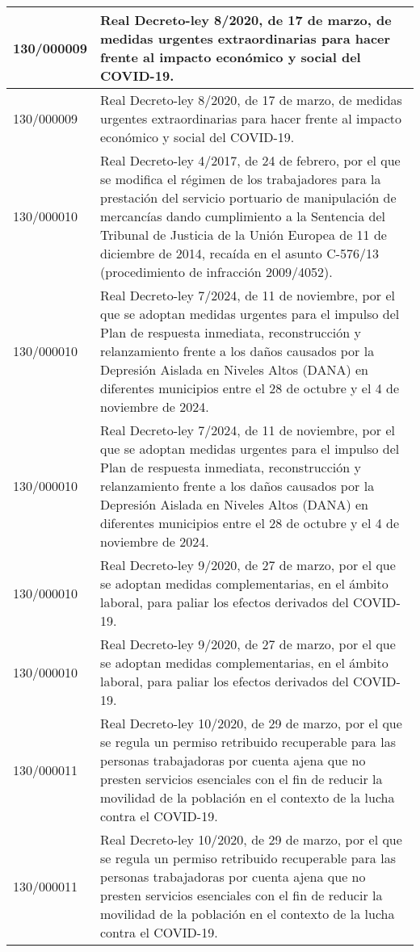 {\begin{table}[H]
\begin{center}
\begin{tabularx}{\linewidth}{| l | X |}
\hline
130/000009 & Real Decreto-ley 8/2020, de 17 de marzo, de medidas urgentes extraordinarias para hacer frente al impacto económico y social del COVID-19. \\
\hline
130/000009 & Real Decreto-ley 8/2020, de 17 de marzo, de medidas urgentes extraordinarias para hacer frente al impacto económico y social del COVID-19. \\
\hline
130/000010 & Real Decreto-ley 4/2017, de 24 de febrero, por el que se modifica el régimen de los trabajadores para la prestación del servicio portuario de manipulación de mercancías dando cumplimiento a la Sentencia del Tribunal de Justicia de la Unión Europea de 11 de diciembre de 2014, recaída en el asunto C-576/13 (procedimiento de infracción 2009/4052). \\
\hline
130/000010 & Real Decreto-ley 7/2024, de 11 de noviembre, por el que se adoptan medidas urgentes para el impulso del Plan de respuesta inmediata, reconstrucción y relanzamiento frente a los daños causados por la Depresión Aislada en Niveles Altos (DANA) en diferentes municipios entre el 28 de octubre y el 4 de noviembre de 2024. \\
\hline
130/000010 & Real Decreto-ley 7/2024, de 11 de noviembre, por el que se adoptan medidas urgentes para el impulso del Plan de respuesta inmediata, reconstrucción y relanzamiento frente a los daños causados por la Depresión Aislada en Niveles Altos (DANA) en diferentes municipios entre el 28 de octubre y el 4 de noviembre de 2024. \\
\hline
130/000010 & Real Decreto-ley 9/2020, de 27 de marzo, por el que se adoptan medidas complementarias, en el ámbito laboral, para paliar los efectos derivados del COVID-19. \\
\hline
130/000010 & Real Decreto-ley 9/2020, de 27 de marzo, por el que se adoptan medidas complementarias, en el ámbito laboral, para paliar los efectos derivados del COVID-19. \\
\hline
130/000011 & Real Decreto-ley 10/2020, de 29 de marzo, por el que se regula un permiso retribuido recuperable para las personas trabajadoras por cuenta ajena que no presten servicios esenciales con el fin de reducir la movilidad de la población en el contexto de la lucha contra el COVID-19. \\
\hline
130/000011 & Real Decreto-ley 10/2020, de 29 de marzo, por el que se regula un permiso retribuido recuperable para las personas trabajadoras por cuenta ajena que no presten servicios esenciales con el fin de reducir la movilidad de la población en el contexto de la lucha contra el COVID-19. \\

\end{tabularx}
\end{center}
\end{table}}
